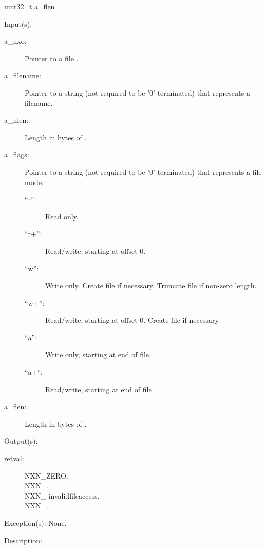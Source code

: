 \begin{capi}
{{uint32\_t a\_flen}}
	\begin{capilist}
	\item[Input(s): ]
		\begin{description}\item[]
		\item[a\_nxo: ]
			Pointer to a file .
		\item[a\_filename: ]
			Pointer to a string (not required to be '{\bs}0'
			terminated) that represents a filename.
		\item[a\_nlen: ]
			Length in bytes of .
		\item[a\_flags: ]
			Pointer to a string (not required to be '{\bs}0'
			terminated) that represents a file mode:
			\begin{description}\item[]
			\item[``r'': ]
				Read only.
			\item[``r+'': ]
				Read/write, starting at offset 0.
			\item[``w'': ]
				Write only.  Create file if necessary.  Truncate
				file if non-zero length.
			\item[``w+'': ]
				Read/write, starting at offset 0.  Create
				file if necessary.
			\item[``a'': ]
				Write only, starting at end of file.
			\item[``a+'': ]
				Read/write, starting at end of file.
			\end{description}
		\item[a\_flen: ]
			Length in bytes of .
		\end{description}
	\item[Output(s): ]
		\begin{description}\item[]
		\item[retval: ]
			\begin{description}\item[]
			\item[NXN\_ZERO.]
			\item[NXN\_.]
			\item[NXN\_
				{invalidfileaccess}.]
			\item[NXN\_.]
			\end{description}
		\end{description}
	\item[Exception(s): ] None.
	\item[Description: ]

\end{capilist}
\end{capi}
